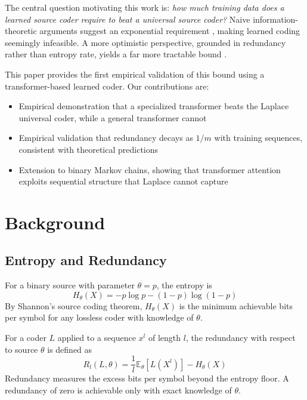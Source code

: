 \documentclass[conference]{IEEEtran}
\begin{document}
The central question motivating this work is: \textit{how much training data does a learned source coder require to beat a universal source coder?} Naive information-theoretic arguments suggest an exponential requirement \cite{hershkovits}, making learned coding seemingly infeasible. A more optimistic perspective, grounded in redundancy rather than entropy rate, yields a far more tractable bound \cite{madsen2020}.

This paper provides the first empirical validation of this bound using a transformer-based learned coder. Our contributions are:
\begin{itemize}
    \item Empirical demonstration that a specialized transformer beats the Laplace universal coder, while a general transformer cannot
    \item Empirical validation that redundancy decays as $1/m$ with training sequences, consistent with theoretical predictions
    \item Extension to binary Markov chains, showing that transformer attention exploits sequential structure that Laplace cannot capture
\end{itemize}

\section{Background}

\subsection{Entropy and Redundancy}

For a binary source with parameter $\theta = p$, the entropy is
\begin{equation}
    H_\theta(X) = -p\log p - (1-p)\log(1-p)
\end{equation}
By Shannon's source coding theorem, $H_\theta(X)$ is the minimum achievable bits per symbol for any lossless coder with knowledge of $\theta$.

For a coder $L$ applied to a sequence $x^l$ of length $l$, the redundancy with respect to source $\theta$ is defined as
\begin{equation}
    R_l(L, \theta) = \frac{1}{l}\mathbb{E}_\theta[L(X^l)] - H_\theta(X)
\end{equation}
Redundancy measures the excess bits per symbol beyond the entropy floor. A redundancy of zero is achievable only with exact knowledge of $\theta$.
\end{document}
